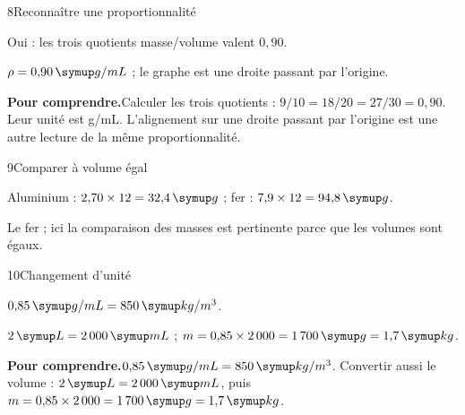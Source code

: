 \par\noindent\begin{minipage}{\linewidth}
\begin{corrige}{8}{Reconnaître une proportionnalité}
\begin{questions}
\item Oui : les trois quotients masse/volume valent $0{,}90$.
\item $\rho=0{,}90\unite{g/mL}$ ; le graphe est une droite passant par l’origine.
\end{questions}
\par\smallskip\noindent\textbf{Pour comprendre.}\enspace Calculer les trois quotients : $9/10=18/20=27/30=0{,}90$. Leur unité est g/mL. L’alignement sur une droite passant par l’origine est une autre lecture de la même proportionnalité.\par
{}
\end{corrige}
\end{minipage}
\par\noindent\begin{minipage}{\linewidth}
\begin{corrige}{9}{Comparer à volume égal}
\begin{questions}
\item Aluminium : $2{,}70\times12=32{,}4\unite g$ ; fer : $7{,}9\times12=94{,}8\unite g$.
\item Le fer ; ici la comparaison des masses est pertinente parce que les volumes sont égaux.
\end{questions}
\end{corrige}
\end{minipage}
\par\noindent\begin{minipage}{\linewidth}
\begin{corrige}{10}{Changement d’unité}
\begin{questions}
\item $0{,}85\unite{g/mL}=850\unite{kg/m^3}$.
\item $2\unite L=2\,000\unite{mL}$ ; $m=0{,}85\times2\,000=1\,700\unite g=1{,}7\unite{kg}$.
\end{questions}
\par\smallskip\noindent\textbf{Pour comprendre.}\enspace $0{,}85\unite{g/mL}=850\unite{kg/m^3}$. Convertir aussi le volume : $2\unite L=2\,000\unite{mL}$, puis $m=0{,}85\times2\,000=1\,700\unite g=1{,}7\unite{kg}$.\par
\end{corrige}
\end{minipage}
